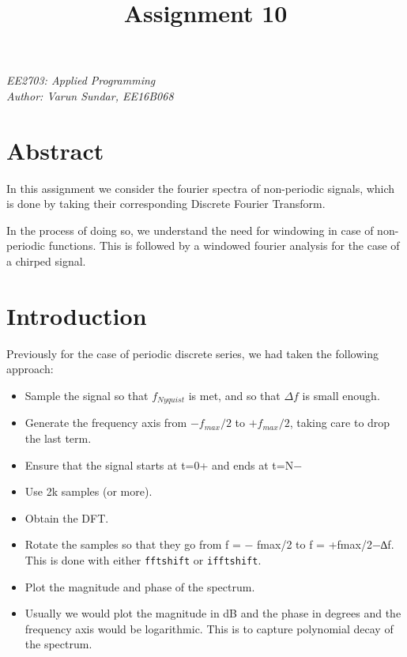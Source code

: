 \documentclass[11pt]{article}
\title{Assignment 10}
\providecommand{\tightlist}{%
      \setlength{\itemsep}{0pt}\setlength{\parskip}{0pt}}
\begin{document}
    
    
    \maketitle
    
    \begin{center}
\emph{EE2703: Applied Programming} \\
\emph{Author: Varun Sundar, EE16B068} \\
\end{center}

\section{Abstract}\label{abstract}

In this assignment we consider the fourier spectra of non-periodic
signals, which is done by taking their corresponding Discrete Fourier
Transform.

In the process of doing so, we understand the need for windowing in case
of non-periodic functions. This is followed by a windowed fourier
analysis for the case of a chirped signal.

\section{Introduction}\label{introduction}

Previously for the case of periodic discrete series, we had taken the
following approach:

\begin{itemize}
\tightlist
\item
  Sample the signal so that \(f_{Nyquist}\) is met, and so that
  \(\Delta f\) is small enough.
\item
  Generate the frequency axis from \(−f_{max}/2\) to \(+ f_{max}/2\),
  taking care to drop the last term.
\item
  Ensure that the signal starts at t=0+ and ends at t=N−
\item
  Use 2k samples (or more).
\item
  Obtain the DFT.
\item
  Rotate the samples so that they go from f = − fmax/2 to f =
  +fmax/2−∆f. This is done with either \texttt{fftshift} or
  \texttt{ifftshift}.
\item
  Plot the magnitude and phase of the spectrum.
\item
  Usually we would plot the magnitude in dB and the phase in degrees and
  the frequency axis would be logarithmic. This is to capture polynomial
  decay of the spectrum.
\end{itemize}
\end{document}

